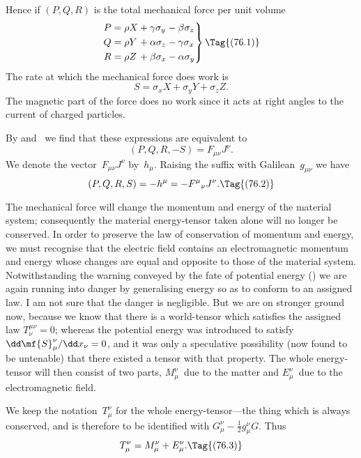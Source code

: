 \documentclass[12pt]{book}
\begin{document}
Hence if $(P, Q, R)$ is the total mechanical force per unit volume
\[
\left.
\begin{alignedat}{3}
P &= \rho X &&+ \gamma \sigma_{y} &&- \beta \sigma_{z}\\
Q &= \rho Y &&+ \alpha \sigma_{z} &&- \gamma\sigma_{x}\\
R &= \rho Z &&+ \beta  \sigma_{x} &&- \alpha\sigma_{y}
\end{alignedat}
\right\}
\Tag{(76.1)}
\]
The rate at which the mechanical force does work is
\[
S = \sigma_{x} X + \sigma_{y} Y + \sigma_{z} Z.
\]
The magnetic part of the force does no work since it acts at right angles to
the current of charged particles.

By  and~ we find that these expressions are equivalent to
%
\[
(P, Q, R, -S) = F_{\mu\nu} J^{\nu}.
\]
We denote the vector~$F_{\mu\nu} J^{\nu}$ by~$h_{\mu}$. Raising the suffix with Galilean~$g_{\mu\nu}$ we
have
\[
(P, Q, R, S) = -h^{\mu} = -{F^{\mu}}_{\nu} J^{\nu}.
\Tag{(76.2)}
\]

The mechanical force will change the momentum and energy of the
material system; consequently the material energy-tensor taken alone will
%
no longer be conserved. In order to preserve the law of conservation of
momentum and energy, we must recognise that the electric field contains an
electromagnetic momentum and energy whose changes are equal and opposite
%
to those of the material system\footnotemark.\footnotetext
  {Notwithstanding the warning conveyed by the fate of potential energy () we are again
  running into danger by generalising energy so as to conform to an assigned law. I am not sure
  that the danger is negligible. But we are on stronger ground now, because we know that there is a
  world-tensor which satisfies the assigned law $T_{\nu}^{\mu\nu} = 0$; whereas the potential energy was introduced
  to satisfy $\dd\mf{S}_{\mu}^{\nu}/\dd x_{\nu} = 0$, and it was only a speculative possibility (now found to be untenable) that
  there existed a tensor with that property.}
The whole energy-tensor will then consist
of two parts, $M_{\mu}^{\nu}$~due to the matter and $E_{\mu}^{\nu}$~due to the electromagnetic field.

{\Loosen We keep the notation~$T_{\mu}^{\nu}$ for the whole energy-tensor---the thing which
is always conserved, and is therefore to be identified with $G_{\mu}^{\nu} - \frac{1}{2}g_{\mu}^{\nu}G$. Thus}
\[
T_{\mu}^{\nu} = M_{\mu}^{\nu} + E_{\mu}^{\nu}.
\Tag{(76.3)}
\]
\end{document}
